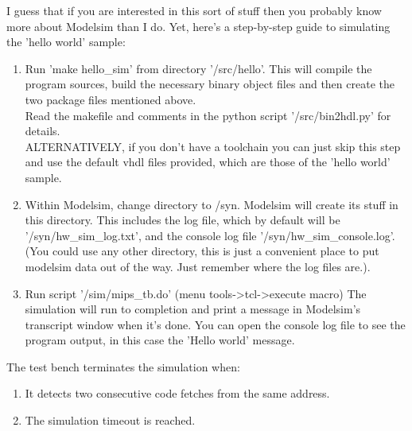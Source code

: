     I guess that if you are interested in this sort of stuff then you probably
    know more about Modelsim than I do. Yet, here's a step-by-step guide to
    simulating the 'hello world' sample:
    
\begin{enumerate}
    \item Run 'make hello\_sim' from directory '/src/hello'.
        This will compile the program sources, build the necessary binary object
        files and then create the two package files mentioned above.\\
        Read the makefile and comments in the python script '/src/bin2hdl.py'
        for details.\\

        ALTERNATIVELY, if you don't have a toolchain you can just skip this
        step and use the default vhdl files provided, which are those of the
        'hello world' sample.\\

    \item Within Modelsim, change directory to /syn. Modelsim will create its 
        stuff in this directory. This includes the
        log file, which by default will be '/syn/hw\_sim\_log.txt', and the 
        console log file '/syn/hw\_sim\_console.log'.\\
        (You could use any other directory, this is just a convenient place to
        put modelsim data out of the way. Just remember where the log files
        are.).

    \item Run script '/sim/mips\_tb.do' (menu tools-\textgreater tcl-\textgreater execute macro)
        The simulation will run to completion and print a message in Modelsim's 
        transcript window when it's done. You can open the console log file 
        to see the program output, in this case the 'Hello world' message.\\

\end{enumerate}
    
    The test bench terminates the simulation when:
    
\begin{enumerate}
    
    \item It detects two consecutive code fetches from the same address.
    \item The simulation timeout is reached.
    
\end{enumerate}
    
